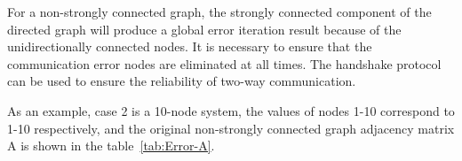 \documentclass[conference]{IEEEtran}
\begin{document}
For a non-strongly connected graph, the strongly connected component of the directed graph will produce a global error iteration result because of the unidirectionally connected nodes. It is necessary to ensure that the communication error nodes are eliminated at all times. The handshake protocol can be used to ensure the reliability of two-way communication.

As an example, case 2 is a 10-node system, the values of nodes 1-10 correspond to 1-10 respectively, and the original non-strongly connected graph adjacency matrix A is shown in the table~\ref{tab:Error-A}.

\end{document}
